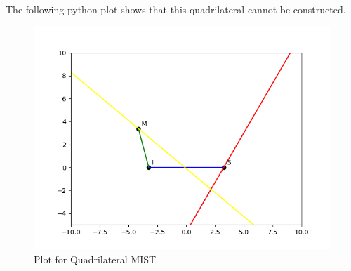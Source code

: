 \documentclass[journal,12pt,twocolumn]{IEEEtran}
\begin{document}
\\The following python plot shows that this quadrilateral cannot be constructed.
\begin{figure}[h]
    \centering
    \includegraphics[scale = 0.52]{figure/Figure_1.png}
    \caption{Plot for Quadrilateral MIST}
    \label{fig:my_label}
\end{figure}
\end{document}
